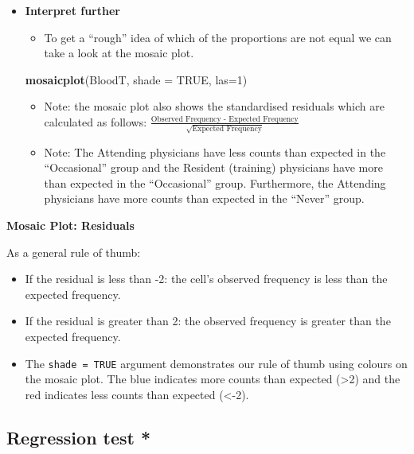 \documentclass[]{article}
\newenvironment{Shaded}{\begin{snugshade}}{\end{snugshade}}
\newcommand{\DataTypeTok}[1]{\textcolor[rgb]{0.13,0.29,0.53}{#1}}
\newcommand{\DecValTok}[1]{\textcolor[rgb]{0.00,0.00,0.81}{#1}}
\newcommand{\KeywordTok}[1]{\textcolor[rgb]{0.13,0.29,0.53}{\textbf{#1}}}
\newcommand{\NormalTok}[1]{#1}
\newcommand{\OtherTok}[1]{\textcolor[rgb]{0.56,0.35,0.01}{#1}}
\providecommand{\tightlist}{%
  \setlength{\itemsep}{0pt}\setlength{\parskip}{0pt}}
\begin{document}
\begin{itemize}
\item
  \textbf{Interpret further}

  \begin{itemize}
  \tightlist
  \item
    To get a ``rough'' idea of which of the proportions are not equal we can take a look at the mosaic plot.
  \end{itemize}

\begin{Shaded}
\begin{Highlighting}[]
\KeywordTok{mosaicplot}\NormalTok{(BloodT, }\DataTypeTok{shade =} \OtherTok{TRUE}\NormalTok{, }\DataTypeTok{las=}\DecValTok{1}\NormalTok{)}
\end{Highlighting}
\end{Shaded}

  \begin{itemize}
  \item
    Note: the mosaic plot also shows the standardised residuals which are calculated as follows: \(\frac{\mbox{Observed Frequency - Expected Frequency}}{\sqrt{\mbox{Expected Frequency}}}\)
  \item
    Note: The Attending physicians have less counts than expected in the ``Occasional'' group and the Resident (training) physicians have more than expected in the ``Occasional'' group. Furthermore, the Attending physicians have more counts than expected in the ``Never'' group.
  \end{itemize}
\end{itemize}

\textbf{Mosaic Plot: Residuals}

As a general rule of thumb:

\begin{itemize}
\item
  If the residual is less than -2: the cell's observed frequency is less than the expected frequency.
\item
  If the residual is greater than 2: the observed frequency is greater than the expected frequency.
\item
  The \texttt{shade\ =\ TRUE} argument demonstrates our rule of thumb using colours on the mosaic plot. The blue indicates more counts than expected (\textgreater{}2) and the red indicates less counts than expected (\textless{}-2).
\end{itemize}

\hypertarget{regression-test}{%
\subsection{Regression test *}\label{regression-test}}
\end{document}
